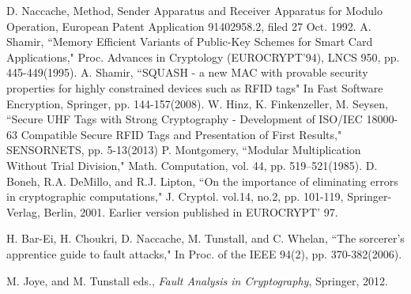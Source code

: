 \documentclass{article}
\begin{document}
\begin{thebibliography}{}
D. Naccache, Method, Sender Apparatus and Receiver Apparatus for
Modulo Operation, European Patent Application 91402958.2, filed
27 Oct. 1992.
A. Shamir, ``Memory Efficient Variants of Public-Key Schemes for
Smart Card Applications," Proc. Advances in Cryptology (EUROCRYPT'94), LNCS 950, pp. 445-449(1995).
A. Shamir, ``SQUASH - a new MAC with provable security properties for highly
constrained devices such as RFID tags" In Fast Software Encryption,  Springer,  pp. 144-157(2008).
W. Hinz, K. Finkenzeller, M. Seysen, 
``Secure UHF Tags with Strong Cryptography - 
Development of ISO/IEC 18000-63 Compatible Secure RFID Tags 
and Presentation of First Results," SENSORNETS, pp. 5-13(2013)
 P. Montgomery, 
``Modular Multiplication Without Trial Division," Math. Computation, vol. 44, pp. 519--521(1985).
 D. Boneh, R.A. DeMillo, and R.J. Lipton, ``On the importance
of eliminating errors in cryptographic computations," J. Cryptol. vol.14, no.2,
pp. 101-119, Springer-Verlag, Berlin, 2001. Earlier version published in EUROCRYPT' 97.

 H. Bar-Ei, H. Choukri, D. Naccache, M. Tunstall, and C. Whelan, 
``The sorcerer's apprentice guide to fault attacks," In Proc. of the IEEE 94(2), pp. 370-382(2006).


 M. Joye, and M. Tunstall eds., 
{\it Fault Analysis in Cryptography}, Springer, 2012.



\end{thebibliography}
\end{document}

